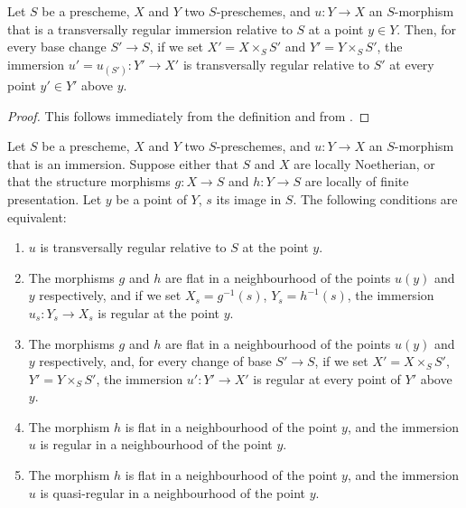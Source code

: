 \begin{proposition}[19.2.3]
\label{IV.19.2.3}
Let $S$ be a prescheme, $X$ and $Y$ two $S$-preschemes, and $u:Y\to X$ an $S$-morphism that is a transversally regular immersion relative to $S$ at a point $y\in Y$.
Then, for every base change $S'\to S$, if we set $X'=X\times_S S'$ and $Y'=Y\times_S S'$, the immersion $u'=u_{(S')}:Y'\to X'$ is transversally regular relative to $S'$ at every point $y'\in Y'$ above $y$.
\end{proposition}

\begin{proof}
This follows immediately from the definition and from .
\end{proof}

\begin{proposition}[19.2.4]
\label{IV.19.2.4}
Let $S$ be a prescheme, $X$ and $Y$ two $S$-preschemes, and $u:Y\to X$ an $S$-morphism that is an immersion.
Suppose \textup{either} that $S$ and $X$ are locally Noetherian, \textup{or} that the structure morphisms $g:X\to S$ and $h:Y\to S$ are locally of finite presentation.
Let $y$ be a point of $Y$, $s$ its image in $S$.
The following conditions are equivalent:
\begin{enumerate}[label=\emph{\alph*)}]
  \item $u$ is transversally regular relative to $S$ at the point $y$.
  \item The morphisms $g$ and $h$ are flat in a neighbourhood of the points $u(y)$ and $y$ respectively, and if we set $X_s=g^{-1}(s)$, $Y_s=h^{-1}(s)$, the immersion $u_s:Y_s\to X_s$ is regular at the point $y$.
  \item[\rm \textup{b$'$)}] The morphisms $g$ and $h$ are flat in a neighbourhood of the points $u(y)$ and $y$ respectively, and, for every change of base $S'\to S$, if we set $X'=X\times_S S'$, $Y'=Y\times_S S'$, the immersion $u':Y'\to X'$ is regular at every point of $Y'$ above $y$.
  \item The morphism $h$ is flat in a neighbourhood of the point $y$, and the immersion $u$ is regular in a neighbourhood of the point $y$.
  \item[\rm \textup{c$'$)}] The morphism $h$ is flat in a neighbourhood of the point $y$, and the immersion $u$ is quasi-regular in a neighbourhood of the point $y$.
\end{enumerate}
\end{proposition}

